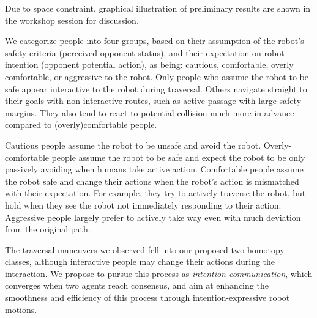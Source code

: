 \documentclass[conference]{IEEEtran}
\begin{document}
Due to space constraint, graphical illustration of preliminary results are 
shown in the workshop session for discussion. 

We categorize people into four groups, based on their assumption of the 
robot's safety criteria (perceived opponent status), and their expectation on 
robot intention (opponent potential action), as being: cautious, comfortable, 
overly comfortable, or aggressive to the robot. Only people who assume the 
robot to be safe appear interactive to the robot during traversal. Others 
navigate straight to their goals with non-interactive routes, such as active 
passage with large safety margins. They also tend to react to potential 
collision much more in advance compared to (overly)comfortable people. 

Cautious people assume the robot to be unsafe and avoid the robot. Overly-comfortable 
people assume the robot to be safe and expect the robot to be only passively avoiding when 
humans take active action. Comfortable people assume the robot safe and change 
their actions when the robot's action is mismatched with their expectation. 
For example, they try to actively traverse the robot, but hold when they see 
the robot not immediately responding to their action. Aggressive people 
largely prefer to actively take way even with much deviation from the original path. 

The traversal maneuvers we observed fell into our proposed two homotopy 
classes, although interactive people may change their actions during the 
interaction. We propose to pursue this process as \textit{intention communication}, 
which converges when two agents reach consensus, and aim at enhancing the 
smoothness and efficiency of this process through intention-expressive robot 
motions.

\vspace{-.3em}
\end{document}
